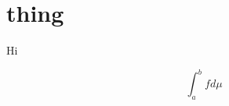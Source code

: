 \documentclass{scrartcl}
\begin{document}
\section{thing}
Hi
\begin{theorem}
  \[
  \int_a^bf d\mu
  \]
\end{theorem}
\end{document}
